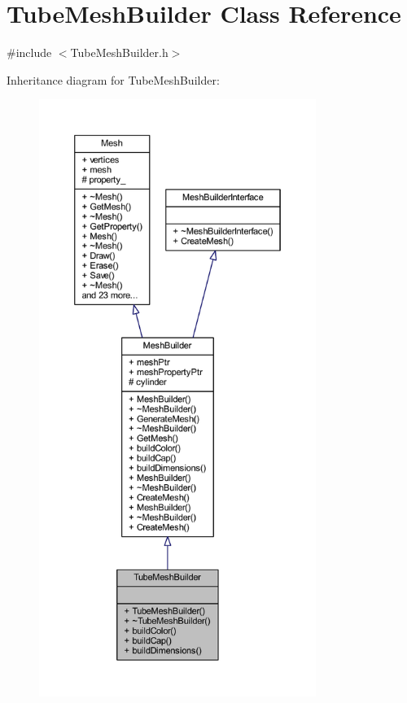 \hypertarget{class_tube_mesh_builder}{}\section{Tube\+Mesh\+Builder Class Reference}
\label{class_tube_mesh_builder}


{\ttfamily \#include $<$Tube\+Mesh\+Builder.\+h$>$}



Inheritance diagram for Tube\+Mesh\+Builder\+:
\nopagebreak
\begin{figure}[H]
\begin{center}
\leavevmode
\includegraphics[height=550pt]{class_tube_mesh_builder__inherit__graph}
\end{center}
\end{figure}


